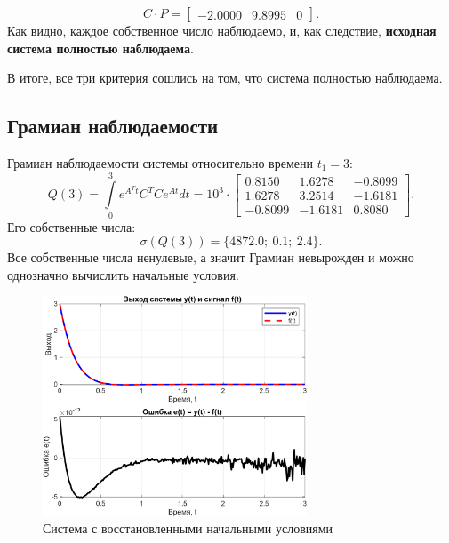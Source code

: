 \begin{equation*}
    C\cdot P=\begin{bmatrix}
        -2.0000 & 9.8995 & 0
    \end{bmatrix}.
\end{equation*}
Как видно, каждое собственное число наблюдаемо, и, как следствие,
\textbf{исходная система полностью наблюдаема}.

В итоге, все три критерия сошлись на том, что система полностью
наблюдаема.

\subsection{Грамиан наблюдаемости}

Грамиан наблюдаемости системы относительно времени $t_1 = 3$:
\begin{equation*}
    Q(3)=\int\limits_{0}^{3}e^{A^Tt}C^TCe^{At}dt=10^3\cdot\begin{bmatrix}
        0.8150&    1.6278  & -0.8099\\
        1.6278 &   3.2514 &  -1.6181\\
       -0.8099  & -1.6181&    0.8080
    \end{bmatrix}.
\end{equation*}
Его собственные числа:
\begin{equation*}
    \sigma(Q(3))=\{4872.0;\ 0.1;\ 2.4\}.
\end{equation*}
Все собственные числа ненулевые, а значит Грамиан невырожден и можно однозначно
вычислить начальные условия.

\begin{figure}[H]
    \centering
    \includegraphics[width=0.7\textwidth]{figs/task_3.png}
    \caption{Система с восстановленными начальными условиями}
    \label{fig:task3}
\end{figure}

